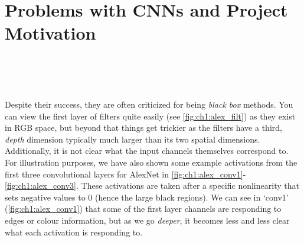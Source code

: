\section{Problems with CNNs and Project Motivation}\label{sec:motivation}
\begin{figure}
  \centering
  \\
  \\
  \\
  \label{fig:ch1:alexnet_filters}
\end{figure}
Despite their success, they are often criticized for being \emph{black box}
methods. You can view the first layer of filters
quite easily (see \autoref{fig:ch1:alex_filt}) as they exist in RGB
space, but beyond that things get trickier as the filters have a third, \emph{depth}
dimension typically much larger than its two spatial dimensions. Additionally,
it is not clear what the input channels themselves correspond to. For illustration
purposes, we have also shown some example activations from the first three
convolutional layers for AlexNet in
\autoref{fig:ch1:alex_conv1}-\autoref{fig:ch1:alex_conv3}. These activations are
taken after a specific nonlinearity that sets negative values to 0 (hence the
large black regions). We can see in `conv1' (\autoref{fig:ch1:alex_conv1}) that
some of the first layer channels are responding to edges or colour information,
but as we go \emph{deeper}, it becomes less and less clear
what each activation is responding to.

